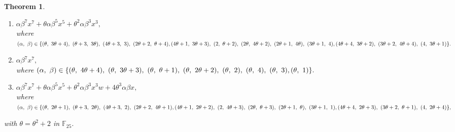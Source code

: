 \documentclass[12pt,a4wide, reqno]{amsart}
\newtheorem{theorem}{Theorem}[section]
\theoremstyle{definition}
\theoremstyle{remark}
\numberwithin{equation}{section}
\begin{document}
\begin{theorem}
\begin{itemize}
\begin{enumerate}[label=\textup{(\arabic*)}]
            where $(\alpha,~\beta)\in\{(4\theta+3,~2\theta+4),~(\theta,,~4\theta+2),~(2\theta+2,~\theta+1),\\~(\theta+3,~4\theta+2),~(2\theta+2,~3\theta+4),~(\theta+3,~4\theta),~(\theta,~\theta),~(4\theta+3,~4\theta),~(\theta,~2\theta+3),\\~(4\theta+3,~4),~(\theta+3,~1),~(2\theta+2,~4),~(\theta+3,~\theta+1),~(2\theta+2,~3\theta+2),\\(4\theta+3,~2\theta+3),~(\theta,~\theta+2),~(\theta+3,~4\theta+1),~(2\theta+2,~2\theta+4),\\(4\theta+3,~4\theta+4),~(4\theta+3,~2\theta+2),~(\theta,~1),~(2\theta+2,~3\theta+1),~(2\theta+2,~4\theta+3),\\(\theta+3,~2\theta+3),~(\theta,~4),~(\theta,~2),~(4\theta+3,~\theta+1),~(\theta+3,~3\theta+2),\\(4\theta+3,~3\theta+3),~(2\theta+2,~\theta+2),~(\theta,~3),~(\theta+3,~\theta+4)\}.$
            \item 
            $\alpha\beta^7x^7+\theta\alpha\beta^5x^5+\theta^2\alpha\beta^3 x^3,$\\
            where $(\alpha,~\beta)\in\{(\theta,~3\theta+4),~(\theta+3,~3\theta),~(4\theta+3,~3),~(2\theta+2,~\theta+4),\\(4\theta+1,~3\theta+3),~(2,~\theta+2),~(2\theta,~4\theta+2),~(2\theta+1,~4\theta),~(3\theta+1,~4),\\(4\theta+4,~3\theta+2),~(3\theta+2,~4\theta+4),~(4,~3\theta+1)\}.$
            \item 
            $\alpha\beta^7x^7,$\\
            where $(\alpha,~\beta)\in\{(\theta,~4\theta+4),~(\theta,~3\theta+3),~(\theta,~\theta+1),~(\theta,~2\theta+2),~(\theta,~2),~(\theta,~4),~(\theta,~3),\\(\theta,~1)\}.$
            \item $\alpha\beta^7x^7+\theta\alpha\beta^5x^5+\theta^2\alpha\beta^3x^3w+4\theta^3\alpha\beta x,$\\
            where $(\alpha,~\beta)\in\{(\theta,~2\theta+1),~(\theta+3,~2\theta),~(4\theta+3,~2),~(2\theta+2,~4\theta+1),\\(4\theta+1,~2\theta+2),~(2,~4\theta+3),~(2\theta,~\theta+3),~(2\theta+1,~\theta),~(3\theta+1,~1),\\(4\theta+4,~2\theta+3),~(3\theta+2,~\theta+1),~(4,~2\theta+4)\},$
            \end{enumerate}
            with $\theta=\theta^2+2$ in $\mathbb{F}_{25}.$
    \end{itemize}
    
\end{theorem}
\end{document}
